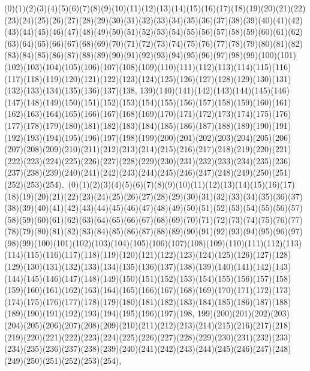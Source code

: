 \documentclass[12pt]{article}
\begin{document}
{(0)(1)(2)(3)(4)(5)(6)(7)(8)(9)(10)(11)(12)(13)(14)(15)(16)(17)(18)(19)(20)(21)(22)(23)(24)(25)(26)(27)(28)(29)(30)(31)(32)(33)(34)(35)(36)(37)(38)(39)(40)(41)(42)(43)(44)(45)(46)(47)(48)(49)(50)(51)(52)(53)(54)(55)(56)(57)(58)(59)(60)(61)(62)(63)(64)(65)(66)(67)(68)(69)(70)(71)(72)(73)(74)(75)(76)(77)(78)(79)(80)(81)(82)(83)(84)(85)(86)(87)(88)(89)(90)(91)(92)(93)(94)(95)(96)(97)(98)(99)(100)(101)(102)(103)(104)(105)(106)(107)(108)(109)(110)(111)(112)(113)(114)(115)(116)(117)(118)(119)(120)(121)(122)(123)(124)(125)(126)(127)(128)(129)(130)(131)(132)(133)(134)(135)(136)(137)(138, 139)(140)(141)(142)(143)(144)(145)(146)(147)(148)(149)(150)(151)(152)(153)(154)(155)(156)(157)(158)(159)(160)(161)(162)(163)(164)(165)(166)(167)(168)(169)(170)(171)(172)(173)(174)(175)(176)(177)(178)(179)(180)(181)(182)(183)(184)(185)(186)(187)(188)(189)(190)(191)(192)(193)(194)(195)(196)(197)(198)(199)(200)(201)(202)(203)(204)(205)(206)(207)(208)(209)(210)(211)(212)(213)(214)(215)(216)(217)(218)(219)(220)(221)(222)(223)(224)(225)(226)(227)(228)(229)(230)(231)(232)(233)(234)(235)(236)(237)(238)(239)(240)(241)(242)(243)(244)(245)(246)(247)(248)(249)(250)(251)(252)(253)(254)$
, 
$
(0)(1)(2)(3)(4)(5)(6)(7)(8)(9)(10)(11)(12)(13)(14)(15)(16)(17)(18)(19)(20)(21)(22)(23)(24)(25)(26)(27)(28)(29)(30)(31)(32)(33)(34)(35)(36)(37)(38)(39)(40)(41)(42)(43)(44)(45)(46)(47)(48)(49)(50)(51)(52)(53)(54)(55)(56)(57)(58)(59)(60)(61)(62)(63)(64)(65)(66)(67)(68)(69)(70)(71)(72)(73)(74)(75)(76)(77)(78)(79)(80)(81)(82)(83)(84)(85)(86)(87)(88)(89)(90)(91)(92)(93)(94)(95)(96)(97)(98)(99)(100)(101)(102)(103)(104)(105)(106)(107)(108)(109)(110)(111)(112)(113)(114)(115)(116)(117)(118)(119)(120)(121)(122)(123)(124)(125)(126)(127)(128)(129)(130)(131)(132)(133)(134)(135)(136)(137)(138)(139)(140)(141)(142)(143)(144)(145)(146)(147)(148)(149)(150)(151)(152)(153)(154)(155)(156)(157)(158)(159)(160)(161)(162)(163)(164)(165)(166)(167)(168)(169)(170)(171)(172)(173)(174)(175)(176)(177)(178)(179)(180)(181)(182)(183)(184)(185)(186)(187)(188)(189)(190)(191)(192)(193)(194)(195)(196)(197)(198, 199)(200)(201)(202)(203)(204)(205)(206)(207)(208)(209)(210)(211)(212)(213)(214)(215)(216)(217)(218)(219)(220)(221)(222)(223)(224)(225)(226)(227)(228)(229)(230)(231)(232)(233)(234)(235)(236)(237)(238)(239)(240)(241)(242)(243)(244)(245)(246)(247)(248)(249)(250)(251)(252)(253)(254)$
, 
$
}
\end{document}
